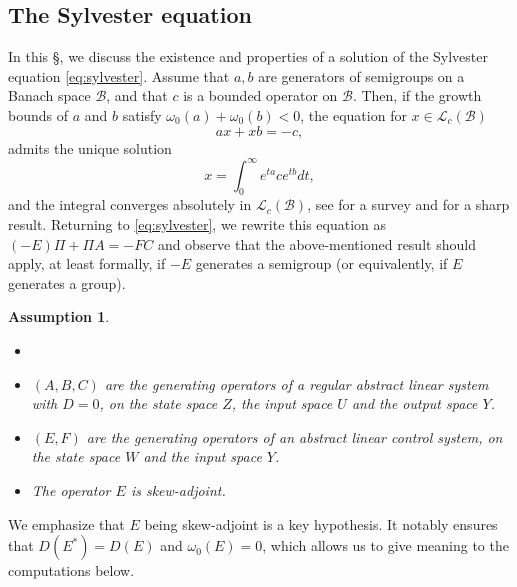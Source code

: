 \documentclass[10pt]{article}
\newtheorem{Assumption}[Theorem]{Assumption}
\begin{document}
\subsection{The Sylvester equation}\label{sec:sylv}
In this \S, we discuss the existence and properties of a solution of the Sylvester equation \eqref{eq:sylvester}. Assume that $a,b$ are generators of semigroups on a Banach space $\mathcal{B}$, and that $c$ is a bounded operator on $\mathcal{B}$. Then, if the growth bounds of $a$ and $b$ satisfy $\omega_0(a) + \omega_0(b) < 0$, the equation for $x \in \mathcal{L}_c(\mathcal{B})$
\[
ax + xb = -c,
\]
admits the unique solution 
\[
x = \int_0^\infty e^{ta} c e^{tb}dt,
\]
and the integral converges absolutely in $\mathcal{L}_c(\mathcal{B})$, see \cite[\S 9]{sylvester_survey} for a survey and \cite[Theorem 3]{phong} for a sharp result. Returning to \eqref{eq:sylvester}, we rewrite this equation as $(-E)\Pi + \Pi A = -FC$ and observe that the above-mentioned result should apply, at least formally, if $-E$ generates a semigroup (or equivalently, if $E$ generates a group).
\begin{Assumption}\label{ass:skew} \begin{itemize}
\item[]
\item $(A,B,C)$ are the generating operators of a regular abstract linear system with $D = 0$, on the state space $Z$, the input space $U$ and the output space $Y$.
\item $(E,F)$ are the generating operators of an abstract linear control system, on the state space $W$ and the input space $Y$. 
\item The operator $E$ is skew-adjoint.  
\end{itemize} 
\end{Assumption}
We emphasize that $E$ being skew-adjoint is a key hypothesis. It notably ensures that $D(E^*)=D(E)$ and $\omega_0(E)=0$, which allows us to give  meaning to the computations below.
\end{document}
